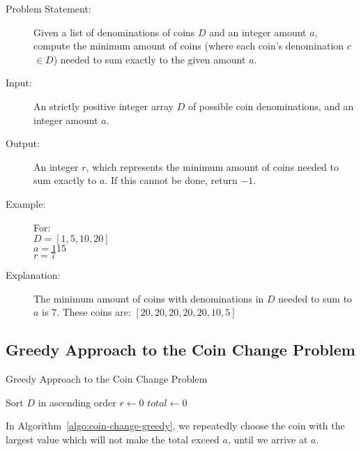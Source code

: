 \begin{description}
    \item[Problem Statement:]
        Given a list of denominations of coins $D$ and an integer amount $a$, compute the minimum amount of coins (where each coin's denomination $c$ $\in D$) needed to sum exactly to the given amount $a$.
        
    \item[Input:] 
        An strictly positive integer array $D$ of possible coin denominations, and an integer amount $a$.
        
    \item[Output:] 
        An integer $r$, which represents the minimum amount of coins needed to sum exactly to $a$. If this cannot be done, return $-1$.
        
    \item[Example:]For:\\ 
    $D = [1, 5, 10, 20]$\\
    $a = 115$\\
    $r = 7$

    \item[Explanation:]
        The minimum amount of coins with denominations in $D$ needed to sum to $a$ is 7.
        These coins are: $[20,20,20,20,20,10,5]$

\end{description}

\subsection{Greedy Approach to the Coin Change Problem}
\begin{algorithm}[H]
    \caption{Greedy Approach to the Coin Change Problem}
    \label{algo:coin-change-greedy}
    Sort $D$ in ascending order\;
    $r \leftarrow 0$\;
    $total \leftarrow 0$\;
\end{algorithm}

In Algorithm~\ref{algo:coin-change-greedy}, we repeatedly choose the coin with the largest value which will not make the total exceed $a$, until we arrive at $a$.

